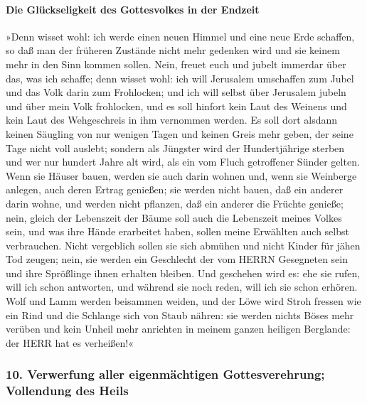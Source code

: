 \hypertarget{die-gluxfcckseligkeit-des-gottesvolkes-in-der-endzeit}{%
\paragraph{Die Glückseligkeit des Gottesvolkes in der
Endzeit}\label{die-gluxfcckseligkeit-des-gottesvolkes-in-der-endzeit}}

»Denn wisset wohl: ich werde einen neuen Himmel und eine
neue Erde schaffen, so daß man der früheren Zustände nicht mehr gedenken
wird und sie keinem mehr in den Sinn kommen sollen. Nein,
freuet euch und jubelt immerdar über das, was ich schaffe; denn wisset
wohl: ich will Jerusalem umschaffen zum Jubel und das Volk darin zum
Frohlocken; und ich will selbst über Jerusalem jubeln und
über mein Volk frohlocken, und es soll hinfort kein Laut des Weinens und
kein Laut des Wehgeschreis in ihm vernommen werden. Es
soll dort alsdann keinen Säugling von nur wenigen Tagen und keinen Greis
mehr geben, der seine Tage nicht voll auslebt; sondern als Jüngster wird
der Hundertjährige sterben und wer nur hundert Jahre alt wird, als ein
vom Fluch getroffener Sünder gelten. Wenn sie Häuser
bauen, werden sie auch darin wohnen und, wenn sie Weinberge anlegen,
auch deren Ertrag genießen; sie werden nicht bauen, daß
ein anderer darin wohne, und werden nicht pflanzen, daß ein anderer die
Früchte genieße; nein, gleich der Lebenszeit der Bäume soll auch die
Lebenszeit meines Volkes sein, und was ihre Hände erarbeitet haben,
sollen meine Erwählten auch selbst verbrauchen. Nicht
vergeblich sollen sie sich abmühen und nicht Kinder für jähen Tod
zeugen; nein, sie werden ein Geschlecht der vom HERRN Gesegneten sein
und ihre Sprößlinge ihnen erhalten bleiben. Und geschehen
wird es: ehe sie rufen, will ich schon antworten, und während sie noch
reden, will ich sie schon erhören. Wolf und Lamm werden
beisammen weiden, und der Löwe wird Stroh fressen wie ein Rind und die
Schlange sich von Staub nähren: sie werden nichts Böses mehr verüben und
kein Unheil mehr anrichten in meinem ganzen heiligen Berglande: der HERR
hat es verheißen!«

\hypertarget{verwerfung-aller-eigenmuxe4chtigen-gottesverehrung-vollendung-des-heils}{%
\subsubsection{10. Verwerfung aller eigenmächtigen Gottesverehrung;
Vollendung des
Heils}\label{verwerfung-aller-eigenmuxe4chtigen-gottesverehrung-vollendung-des-heils}}


